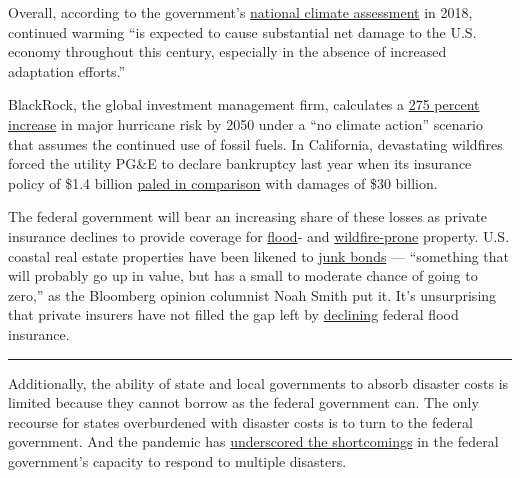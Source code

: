 Overall, according to the government's
\href{https://nca2018.globalchange.gov/}{national climate assessment} in
2018, continued warming ``is expected to cause substantial net damage to
the U.S. economy throughout this century, especially in the absence of
increased adaptation efforts.''

BlackRock, the global investment management firm, calculates a
\href{https://www.blackrock.com/us/individual/literature/whitepaper/bii-physical-climate-risks-april-2019.pdf}{275
percent increase} in major hurricane risk by 2050 under a ``no climate
action'' scenario that assumes the continued use of fossil fuels. In
California, devastating wildfires forced the utility PG\&E to declare
bankruptcy last year when its insurance policy of \$1.4 billion
\href{https://www.forbes.com/sites/christopherhelman/2018/11/15/californias-electric-giant-faces-possible-30-billion-in-damages-for-fires-that-have-killed-more-than-100/\#5079293238c2}{paled
in comparison} with damages of \$30 billion.

The federal government will bear an increasing share of these losses as
private insurance declines to provide coverage for
\href{https://www.nytimes3xbfgragh.onion/interactive/2020/06/29/climate/hidden-flood-risk-maps.html}{flood}-
and
\href{https://www.wsj.com/articles/no-one-can-agree-on-how-to-price-california-home-insurance-for-wildfires-11568649298}{wildfire-prone}
property. U.S. coastal real estate properties have been likened to
\href{https://nam11.safelinks.protection.outlook.com/?url=https\%3A\%2F\%2Fwww.bloomberg.com\%2Fopinion\%2Farticles\%2F2018-05-03\%2Fflood-risk-makes-coastal-real-estate-look-like-a-junk-bond\%3Fsref\%3D8nb4B7zL\&data=02\%7C01\%7Cnsteel\%40rmi.org\%7Cadec35ab733049a0b57008d816fd9823\%7C8ed8a585d8e64b00b9ccd370783559f6\%7C1\%7C0\%7C637284625728410773\&sdata=mCgVuOl8Z2sg76JVje\%2B100Q5ANUcp2gtGuEpCqupcok\%3D\&reserved=0}{junk
bonds} --- ``something that will probably go up in value, but has a
small to moderate chance of going to zero,'' as the Bloomberg opinion
columnist Noah Smith put it. It's unsurprising that private insurers
have not filled the gap left by
\href{http://www.ouazad.com/resources/paper_kahn_ouazad.pdf}{declining}
federal flood insurance.

\begin{center}\rule{0.5\linewidth}{\linethickness}\end{center}

Additionally, the ability of state and local governments to absorb
disaster costs is limited because they cannot borrow as the federal
government can. The only recourse for states overburdened with disaster
costs is to turn to the federal government. And the pandemic has
\href{https://www.nytimes3xbfgragh.onion/2020/05/22/climate/fema-volunteer-disaster-response.html}{underscored
the shortcomings} in the federal government's capacity to respond to
multiple disasters.

